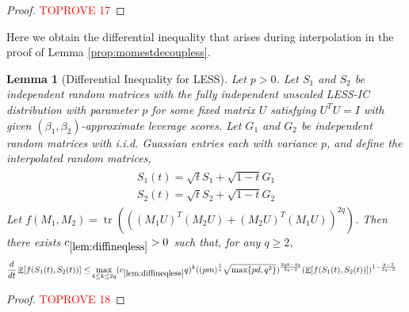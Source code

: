 \documentclass[11pt]{amsart}
\numberwithin{equation}{section}
\numberwithin{equation}{section}
\DeclareMathOperator{\E}{\mathbb{E}}
\DeclareMathOperator*{\tr}{tr}
\newtheorem{lemma}[theorem]{Lemma}
\theoremstyle{remark}
\theoremstyle{definition}
\begin{document}
\begin{proof}\textcolor{red}{TOPROVE 17}\end{proof}






Here we obtain the differential inequality that arises during interpolation in the proof of Lemma \ref{prop:momestdecoupless}. 
\begin{lemma}[Differential Inequality for LESS]\label{lem:diffineqless}
Let $p>0$. Let $S_1$ and $S_2$ be independent random matrices with the fully independent unscaled LESS-IC distribution with parameter $p$ for some fixed matrix $U$  satisfying $U^TU=I$ with given $(\beta_1, \beta_2)$-approximate leverage scores. Let $G_1$ and $G_2$ be independent random matrices with i.i.d. Guassian entries each with variance $p$, and define the interpolated random matrices,
\begin{align}
\begin{split} 
    S_1(t) = \sqrt{t}S_1 + \sqrt{1-t}G_1 \\
    S_2(t) = \sqrt{t}S_2 + \sqrt{1-t}G_2
\end{split}
\end{align}
Let $f(M_1,M_2)=\tr(((M_1U)^T(M_2U)+(M_2U)^T(M_1U))^{2q})$.
Then there exists $c_{\ref*{lem:diffineqless}} >0$ such that, for any $q\ge 2$,
\begin{align*}
    \frac{d}{dt} \E[f(S_1(t),S_2(t))] \le&  \max \limits_{4 \le k \le 2q} (c_{\ref*{lem:diffineqless}}q)^k ((pm)^\frac{1}{q}\sqrt{\max\{ pd,q^2\}})^{\frac{2qk-4q}{2q-2}}(\E[f(S_1(t),S_2(t))])^{1-\frac{k-2}{2q-2}}
\end{align*}
\end{lemma}


\begin{proof}\textcolor{red}{TOPROVE 18}\end{proof}
\end{document}
